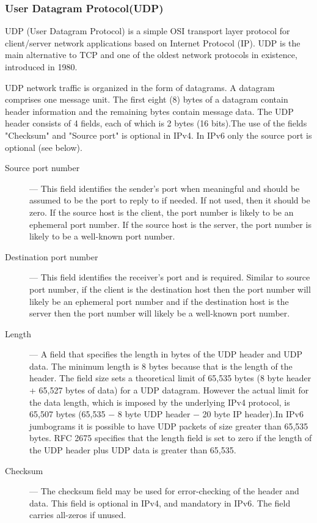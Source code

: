 \documentclass[12pt]{article}
\theoremstyle{definition}
\begin{document}
			\subsubsection{User Datagram Protocol(UDP)}
			UDP (User Datagram Protocol) is a simple OSI transport layer protocol for client/server network applications based on Internet Protocol (IP). UDP is the main alternative to TCP and one of the oldest network protocols in existence, introduced in 1980.
			
			UDP network traffic is organized in the form of datagrams. A datagram comprises one message unit. The first eight (8) bytes of a datagram contain header information and the remaining bytes contain message data.
			The UDP header consists of 4 fields, each of which is 2 bytes (16 bits).The use of the fields "Checksum" and "Source port" is optional in IPv4. In IPv6 only the source port is optional (see below).
			
			\begin{description}
				\item [Source port number] ---
				This field identifies the sender's port when meaningful and should be assumed to be the port to reply to if needed. If not used, then it should be zero. If the source host is the client, the port number is likely to be an ephemeral port number. If the source host is the server, the port number is likely to be a well-known port number.
				
				\item [Destination port number] ---
				This field identifies the receiver's port and is required. Similar to source port number, if the client is the destination host then the port number will likely be an ephemeral port number and if the destination host is the server then the port number will likely be a well-known port number.
				
				\item [Length] ---
				A field that specifies the length in bytes of the UDP header and UDP data. The minimum length is 8 bytes because that is the length of the header. The field size sets a theoretical limit of 65,535 bytes (8 byte header + 65,527 bytes of data) for a UDP datagram. However the actual limit for the data length, which is imposed by the underlying IPv4 protocol, is 65,507 bytes (65,535 − 8 byte UDP header − 20 byte IP header).In IPv6 jumbograms it is possible to have UDP packets of size greater than 65,535 bytes. RFC 2675 specifies that the length field is set to zero if the length of the UDP header plus UDP data is greater than 65,535.
				
				\item[Checksum] ---
				The checksum field may be used for error-checking of the header and data. This field is optional in IPv4, and mandatory in IPv6. The field carries all-zeros if unused.
			\end{description}
		
\end{document}
